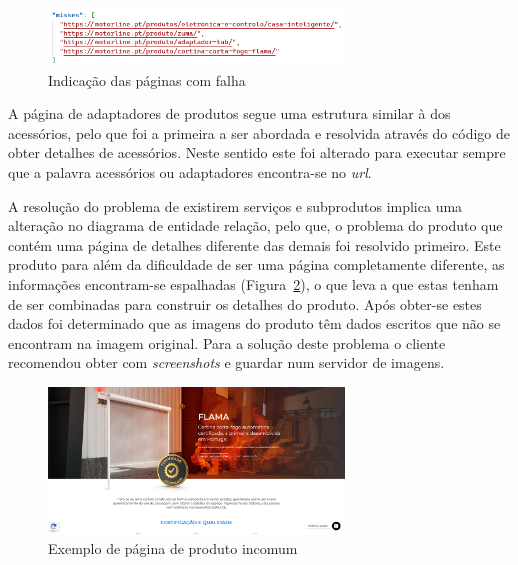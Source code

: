 
\begin{figure}[htb]
  \centering
  
  \includegraphics[width=0.7\textwidth]{images/implementacao/scraper/melhor_corrida.png}
  \caption{Indicação das páginas com falha}
  \label{fig:59}
\end{figure}



A página de adaptadores de produtos segue uma estrutura similar à dos acessórios, pelo que foi a primeira a ser abordada e resolvida através do código de obter detalhes de acessórios. Neste sentido este foi alterado para executar sempre que a palavra acessórios ou adaptadores encontra-se no \textit{url}.

A resolução do problema de existirem serviços e subprodutos implica uma alteração no diagrama de entidade relação, pelo que, o problema do produto que contém uma página de detalhes diferente das demais foi resolvido primeiro. Este produto para além da dificuldade de ser uma página completamente diferente, as informações encontram-se espalhadas (Figura~\ref*{fig:60}), o que leva a que estas tenham de ser combinadas para construir os detalhes do produto. Após obter-se estes dados foi determinado que as imagens do produto têm dados escritos que não se encontram na imagem original. Para a solução deste problema o cliente recomendou obter com \textit{screenshots} e guardar num servidor de imagens.

\begin{figure}[htb]
  \centering
  \includegraphics[width=0.7\textwidth]{images/implementacao/scraper/flama.png}
  \caption{Exemplo de página de produto incomum}
  \label{fig:60}
\end{figure}


